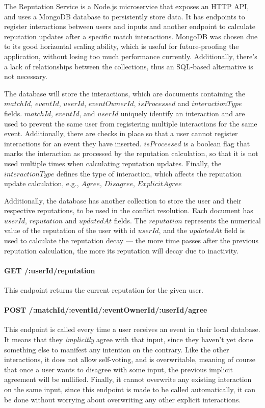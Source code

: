 The Reputation Service is a Node.js microservice that exposes an HTTP API, and uses a \mbox{MongoDB} database to persistently store data. It has endpoints to register interactions between users and inputs and another endpoint to calculate reputation updates after a specific match interactions. MongoDB was chosen due to its good horizontal scaling ability, which is useful for future-proofing the application, without losing too much performance currently. Additionally, there's a lack of relationships between the collections, thus an SQL-based alternative is not necessary.

The database will store the interactions, which are documents containing the $matchId$, $eventId$, $userId$, $eventOwnerId$, $isProcessed$ and $interactionType$ fields. $matchId$, $eventId$, and $userId$ uniquely identify an interaction and are used to prevent the same user from registering multiple interactions for the same event. Additionally, there are checks in place so that a user cannot register interactions for an event they have inserted. $isProcessed$ is a boolean flag that marks the interaction as processed by the reputation calculation, so that it is not used multiple times when calculating reputation updates. Finally, the $interactionType$ defines the type of interaction, which affects the reputation update calculation, e.g., $Agree$, $Disagree$, $Explicit Agree$

Additionally, the database has another collection to store the user and their respective reputations, to be used in the conflict resolution. Each document has $userId$, $reputation$ and $updatedAt$ fields. The $reputation$ represents the numerical value of the reputation of the user with id $userId$, and the $updatedAt$ field is used to calculate the reputation decay --- the more time passes after the previous reputation calculation, the more its reputation will decay due to inactivity.

\paragraph{GET /:userId/reputation}

This endpoint returns the current reputation for the given user.

\paragraph{POST /:matchId/:eventId/:eventOwnerId/:userId/agree}

This endpoint is called every time a user receives an event in their local database. It means that they \textit{implicitly} agree with that input, since they haven't yet done something else to manifest any intention on the contrary. Like the other interactions, it does not allow self-voting, and is overwritable, meaning of course that once a user wants to disagree with some input, the previous implicit agreement will be nullified. Finally, it cannot overwrite any existing interaction on the same input, since this endpoint is made to be called automatically, it can be done without worrying about overwriting any other explicit interactions.

